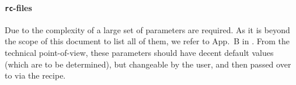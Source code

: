 \paragraph{\texttt{rc}-files\\}\label{app:mf_model_rc}
Due to the complexity of \mf a large set of parameters are required. As it is beyond the scope of this document to list all of them, we refer to App.~B in \cite{molecfit}. From the technical point-of-view, these parameters should have decent default values (which are to be determined), but changeable by the user, and then passed over to \mf via the recipe. 

